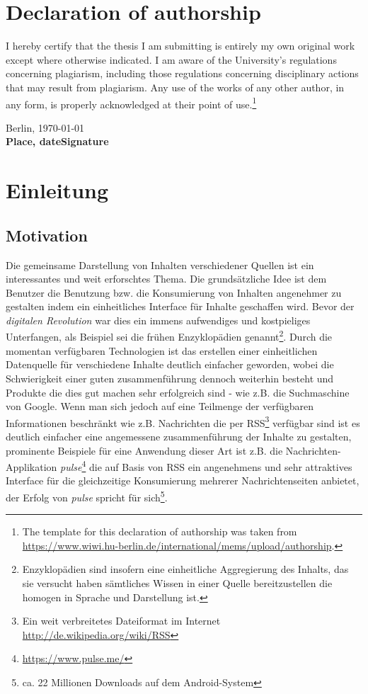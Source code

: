 \documentclass[12pt,twoside]{book}
\newcommand\blankpage{%
    \null
    \thispagestyle{empty}%
    \addtocounter{page}{-1}%
    \newpage}
\begin{document}

\chapter*{Declaration of authorship}

I hereby certify that the thesis I am submitting is entirely my own original work except where otherwise indicated. I am aware of the University's regulations concerning plagiarism, including those regulations concerning disciplinary actions that may result from plagiarism. Any use of the works of any other author, in any form, is properly acknowledged at their point of use.\footnote{The template for this declaration of authorship was taken from \url{https://www.wiwi.hu-berlin.de/international/mems/upload/authorship}.}

\vspace{2cm}

Berlin, \today\\
\textbf{Place, date}\hfill\textbf{Signature}

\tableofcontents
\newpage


\chapter{Einleitung}

\section*{Motivation}

Die gemeinsame Darstellung von Inhalten verschiedener Quellen ist ein interessantes und weit erforschtes Thema. Die grundsätzliche Idee ist dem Benutzer die Benutzung bzw. die Konsumierung von Inhalten angenehmer zu gestalten indem ein einheitliches Interface für Inhalte geschaffen wird. Bevor der \textit{digitalen Revolution} war dies ein immens aufwendiges und kostpieliges Unterfangen, als Beispiel sei die frühen Enzyklopädien genannt\footnote{Enzyklopädien sind insofern eine einheitliche Aggregierung des Inhalts, das sie versucht haben sämtliches Wissen in einer Quelle bereitzustellen die homogen in Sprache und Darstellung ist.}. Durch die momentan verfügbaren Technologien ist das erstellen einer einheitlichen Datenquelle für verschiedene Inhalte deutlich einfacher geworden, wobei die Schwierigkeit einer guten zusammenführung dennoch weiterhin besteht und Produkte die dies gut machen sehr erfolgreich sind - wie z.B. die Suchmaschine von Google.
Wenn man sich jedoch auf eine Teilmenge der verfügbaren Informationen beschränkt wie z.B. Nachrichten die per RSS\footnote{Ein weit verbreitetes Dateiformat im Internet \url{http://de.wikipedia.org/wiki/RSS}} verfügbar sind ist es deutlich einfacher eine angemessene zusammenführung der Inhalte zu gestalten, prominente Beispiele für eine Anwendung dieser Art ist z.B. die Nachrichten-Applikation \textit{pulse}\footnote{\url{https://www.pulse.me/}} die auf Basis von RSS ein angenehmens und sehr attraktives Interface für die gleichzeitige Konsumierung mehrerer Nachrichtenseiten anbietet, der Erfolg von \textit{pulse} spricht für sich\footnote{ca. 22 Millionen Downloads auf dem Android-System}.
\end{document}
